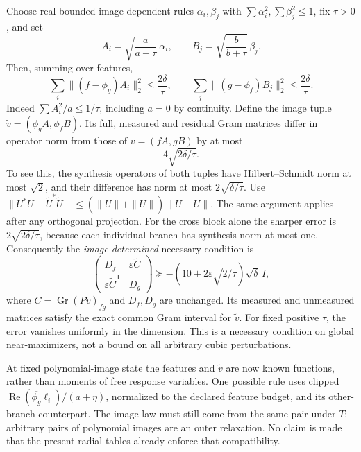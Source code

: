 Choose real bounded image-dependent rules $\alpha_i,\beta_j$ with
$\sum\alpha_i^2,\sum\beta_j^2\le1$, fix $\tau>0$, and set
\[
 A_i=\sqrt{\frac a{a+\tau}}\,\alpha_i,
 \qquad B_j=\sqrt{\frac b{b+\tau}}\,\beta_j.
\]
Then, summing over features,
\begin{equation}\label{eq:shared-cutoff-alignment}
 \sum_i\|(f-\phi_g)A_i\|_2^2\le\frac{2\delta}{\tau},\qquad
 \sum_j\|(g-\phi_f)B_j\|_2^2\le\frac{2\delta}{\tau}.
\end{equation}
Indeed $\sum A_i^2/a\le1/\tau$, including $a=0$ by continuity.
Define the image tuple
$\widetilde v=(\phi_g A,\phi_f B)$. Its full, measured and residual
Gram matrices differ in operator norm from those of $v=(fA,gB)$ by at most
\[
 4\sqrt{2\delta/\tau}.
\]
To see this, the synthesis operators of both tuples have Hilbert--Schmidt
norm at most $\sqrt2$, and their difference has norm at most
$2\sqrt{\delta/\tau}$. Use
$\|U^*U-\widetilde U^*\widetilde U\|
\le(\|U\|+\|\widetilde U\|)\|U-\widetilde U\|$.
The same argument applies after any orthogonal projection.
For the cross block alone the sharper error is
$2\sqrt{2\delta/\tau}$, because each individual branch has synthesis norm
at most one. Consequently the \emph{image-determined} necessary condition is
\begin{equation}\label{eq:shared-image-stability}
 \boxed{\begin{pmatrix}D_f&\varepsilon\widetilde C\\
       \varepsilon\widetilde C^{\mathsf T}&D_g\end{pmatrix}
       \succeq-\left(10+2\varepsilon\sqrt{2/\tau}\right)\sqrt\delta\,I,}
\end{equation}
where $\widetilde C=\operatorname{Gr}(P\widetilde v)_{fg}$ and $D_f,D_g$
are unchanged. Its measured and unmeasured matrices satisfy the exact common
Gram interval for $\widetilde v$. For fixed positive $\tau$, the error vanishes
uniformly in the dimension. This is a necessary condition on global
near-maximizers, not a bound on all arbitrary cubic perturbations.

At fixed polynomial-image state the features and $\widetilde v$ are now
known functions, rather than moments of free response variables. One possible
rule uses clipped $\operatorname{Re}(\overline{\phi_g}\ell_i)/(a+\eta)$,
normalized to the declared feature budget, and its other-branch counterpart.
The image law must still come from the same pair under $T$; arbitrary pairs
of polynomial images are an outer relaxation. No claim is made that the
present radial tables already enforce that compatibility.


